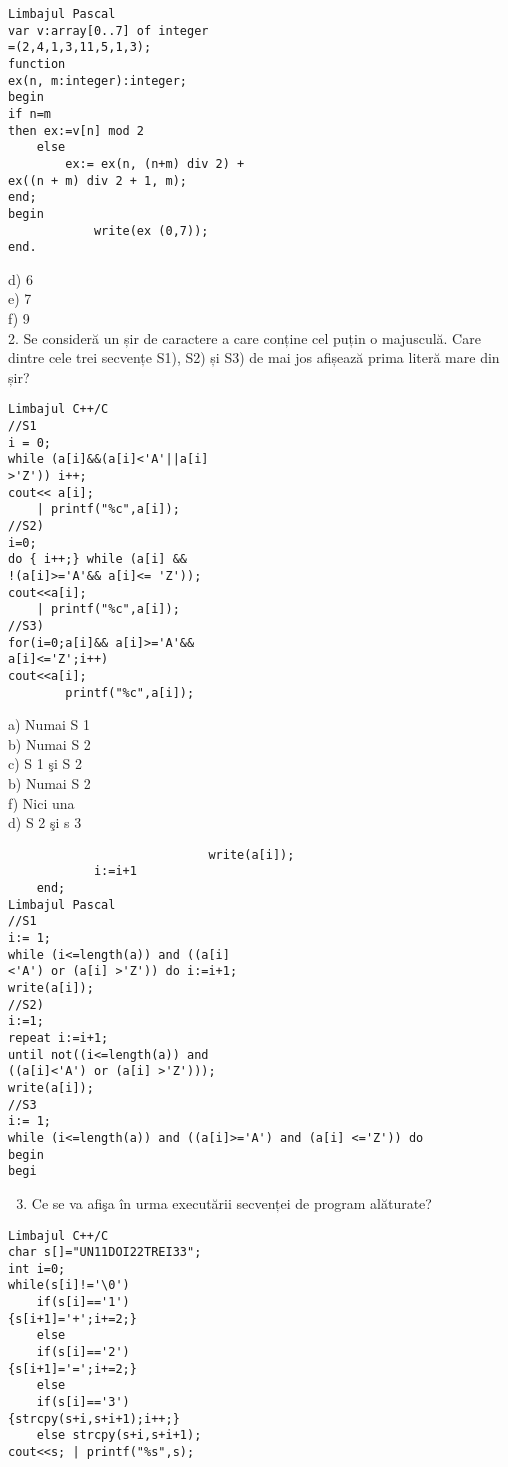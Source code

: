 \begin{verbatim}
Limbajul Pascal
var v:array[0..7] of integer
=(2,4,1,3,11,5,1,3);
function
ex(n, m:integer):integer;
begin
if n=m
then ex:=v[n] mod 2
    else
        ex:= ex(n, (n+m) div 2) +
ex((n + m) div 2 + 1, m);
end;
begin
            write(ex (0,7));
end.
\end{verbatim}

d) 6\\
e) 7\\
f) 9\\
2. Se consideră un șir de caractere a care conține cel puțin o majusculă. Care dintre cele trei secvențe S1), S2) și S3) de mai jos afișează prima literă mare din șir?

\begin{verbatim}
Limbajul C++/C
//S1
i = 0;
while (a[i]&&(a[i]<'A'||a[i]
>'Z')) i++;
cout<< a[i];
    | printf("%c",a[i]);
//S2)
i=0;
do { i++;} while (a[i] &&
!(a[i]>='A'&& a[i]<= 'Z'));
cout<<a[i];
    | printf("%c",a[i]);
//S3)
for(i=0;a[i]&& a[i]>='A'&&
a[i]<='Z';i++)
cout<<a[i];
        printf("%c",a[i]);
\end{verbatim}

a) Numai S 1\\
b) Numai S 2\\
c) S 1 şi S 2\\
b) Numai S 2\\
f) Nici una\\
d) S 2 şi s 3

\begin{verbatim}
                            write(a[i]);
            i:=i+1
    end;
Limbajul Pascal
//S1
i:= 1;
while (i<=length(a)) and ((a[i]
<'A') or (a[i] >'Z')) do i:=i+1;
write(a[i]);
//S2)
i:=1;
repeat i:=i+1;
until not((i<=length(a)) and
((a[i]<'A') or (a[i] >'Z')));
write(a[i]);
//S3
i:= 1;
while (i<=length(a)) and ((a[i]>='A') and (a[i] <='Z')) do
begin
begi
\end{verbatim}

\begin{enumerate}
  \setcounter{enumi}{2}
  \item Ce se va afişa în urma executării secvenței de program alăturate?
\end{enumerate}

\begin{verbatim}
Limbajul C++/C
char s[]="UN11DOI22TREI33";
int i=0;
while(s[i]!='\0')
    if(s[i]=='1')
{s[i+1]='+';i+=2;}
    else
    if(s[i]=='2')
{s[i+1]='=';i+=2;}
    else
    if(s[i]=='3')
{strcpy(s+i,s+i+1);i++;}
    else strcpy(s+i,s+i+1);
cout<<s; | printf("%s",s);
\end{verbatim}

